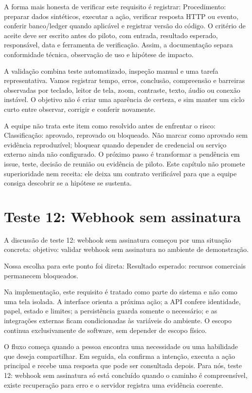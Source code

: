 \documentclass[12pt,oneside,a4paper,article]{abntex2}
\begin{document}
A forma mais honesta de verificar este requisito é registrar: Procedimento: preparar dados sintéticos, executar a ação, verificar resposta HTTP ou evento, conferir banco/ledger quando aplicável e registrar versão do código. O critério de aceite deve ser escrito antes do piloto, com entrada, resultado esperado, responsável, data e ferramenta de verificação. Assim, a documentação separa conformidade técnica, observação de uso e hipótese de impacto.

A validação combina teste automatizado, inspeção manual e uma tarefa representativa. Vamos registrar tempo, erros, conclusão, compreensão e barreiras observadas por teclado, leitor de tela, zoom, contraste, texto, áudio ou conexão instável. O objetivo não é criar uma aparência de certeza, e sim manter um ciclo curto entre observar, corrigir e conferir novamente.

A equipe não trata este item como resolvido antes de enfrentar o risco: Classificação: aprovado, reprovado ou bloqueado. Não marcar como aprovado sem evidência reproduzível; bloquear quando depender de credencial ou serviço externo ainda não configurado. O próximo passo é transformar a pendência em issue, teste, decisão de reunião ou evidência de piloto. Este capítulo não promete superioridade nem receita: ele deixa um contrato verificável para que a equipe consiga descobrir se a hipótese se sustenta.

\section{Teste 12: Webhook sem assinatura}
A discussão de teste 12: webhook sem assinatura começou por uma situação concreta: objetivo: validar webhook sem assinatura no ambiente de demonstração.

Nossa escolha para este ponto foi direta: Resultado esperado: recursos comerciais permanecem bloqueados.

Na implementação, este requisito é tratado como parte do sistema e não como uma tela isolada. A interface orienta a próxima ação; a API confere identidade, papel, estado e limites; a persistência guarda somente o necessário; e as integrações externas ficam condicionadas às variáveis do ambiente. O escopo continua exclusivamente de software, sem depender de escopo físico.

O fluxo começa quando a pessoa encontra uma necessidade ou uma habilidade que deseja compartilhar. Em seguida, ela confirma a intenção, executa a ação principal e recebe uma resposta que pode ser consultada depois. Para nós, teste 12: webhook sem assinatura só está concluído quando o caminho é compreensível, existe recuperação para erro e o servidor registra uma evidência coerente.
\end{document}
